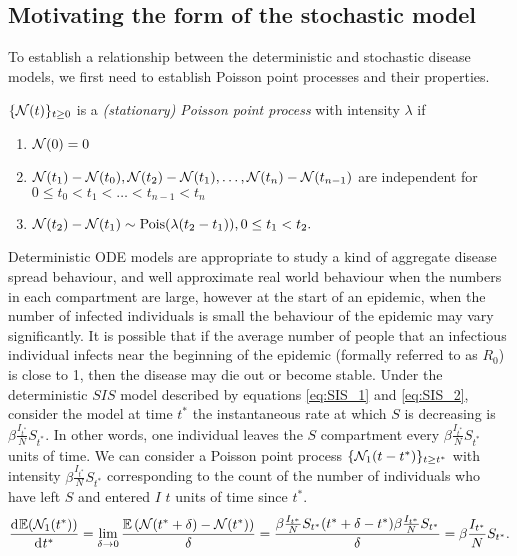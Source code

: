 \subsection*{Motivating the form of the stochastic model}

To establish a relationship between the deterministic and stochastic disease models, we first need to establish Poisson point processes and their properties.

\begin{definition}\label{def:ppp}
    $\{\mathcal{N}(t)\}_{t\geq0}$ is a \emph{(stationary) Poisson point process} with intensity $\lambda$ if \begin{enumerate}
        \item $\mathcal{N}(0) = 0$
        \item $\mathcal{N}(t_1) - \mathcal{N}(t_0), \mathcal{N}(t_2) - \mathcal{N}(t_1), \dots, \mathcal{N}(t_n) - \mathcal{N}(t_{n-1})$ are independent for $0 \leq t_0 < t_1 < \dots < t_{n-1} < t_n $
        \item $\mathcal{N}(t_2) - \mathcal{N}(t_1) \sim \operatorname{Pois}(\lambda(t_2 - t_1)), 0 \leq t_1 < t_2.$
    \end{enumerate}
\end{definition}

Deterministic ODE models are appropriate to study a kind of aggregate disease spread behaviour, and well approximate real world behaviour when the numbers in each compartment are large, however at the start of an epidemic, when the number of infected individuals is small the behaviour of the epidemic may vary significantly. It is possible that if the average number of people that an infectious individual infects near the beginning of the epidemic (formally referred to as $R_0$) is close to 1, then the disease may die out or become stable. Under the deterministic $SIS$ model described by equations \ref{eq:SIS_1} and \ref{eq:SIS_2}, consider the model at time $t^*$ the instantaneous rate at which $S$ is decreasing is $\beta \frac{I_{t^*}}{N} S_{t^*}.$ In other words, one individual leaves the $S$ compartment every $\beta \frac{I_{t^*}}{N} S_{t^*}$ units of time. We can consider a Poisson point process $\{\mathcal{N}_1(t - t^*)\}_{t\geq t^*}$ with intensity $\beta \frac{I_{t^*}}{N} S_{t^*}$ corresponding to the count of the number of individuals who have left $S$ and entered $I$ $t$ units of time since $t^*.$ $$\frac{\diff \E(\N_1(t^*))}{\diff t^*} = \lim_{\delta \to 0}\frac{\E{(\N(t^* + \delta) - \N(t^*))}}{\delta} = \frac{\beta \frac{I_{t^*}}{N} S_{t^*}(t^* + \delta - t^*)\beta \frac{I_{t^*}}{N} S_{t^*}}{\delta} = \beta \frac{I_{t^*}}{N} S_{t^*}.$$

